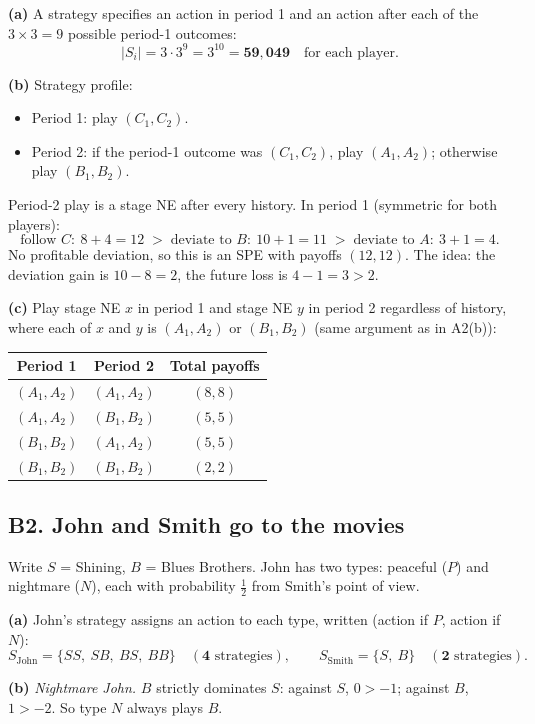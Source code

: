 \documentclass[11pt]{article}
\begin{document}
\textbf{(a)} A strategy specifies an action in period 1 and an action after each of the $3\times3=9$ possible period-1 outcomes:
\[
  |S_i| = 3\cdot 3^{9}=3^{10}=\mathbf{59{,}049}\quad\text{for each player.}
\]

\textbf{(b)} Strategy profile:
\begin{itemize}
  \item Period 1: play $(C_1,C_2)$.
  \item Period 2: if the period-1 outcome was $(C_1,C_2)$, play $(A_1,A_2)$; otherwise play $(B_1,B_2)$.
\end{itemize}
Period-2 play is a stage NE after every history. In period 1 (symmetric for both players):
\[
  \text{follow } C:\ 8+4=12 \;>\; \text{deviate to } B:\ 10+1=11 \;>\; \text{deviate to } A:\ 3+1=4 .
\]
No profitable deviation, so this is an SPE with payoffs $(12,12)$.
The idea: the deviation gain is $10-8=2$, the future loss is $4-1=3>2$.

\textbf{(c)} Play stage NE $x$ in period 1 and stage NE $y$ in period 2 regardless of history, where each of $x$ and $y$ is $(A_1,A_2)$ or $(B_1,B_2)$ (same argument as in A2(b)):
\begin{center}
\begin{tabular}{c|c|c}
  Period 1 & Period 2 & Total payoffs \\ \hline
  $(A_1,A_2)$ & $(A_1,A_2)$ & $(8,8)$ \\
  $(A_1,A_2)$ & $(B_1,B_2)$ & $(5,5)$ \\
  $(B_1,B_2)$ & $(A_1,A_2)$ & $(5,5)$ \\
  $(B_1,B_2)$ & $(B_1,B_2)$ & $(2,2)$
\end{tabular}
\end{center}

\subsection*{B2. John and Smith go to the movies}
Write $S$ = Shining, $B$ = Blues Brothers. John has two types: peaceful ($P$) and nightmare ($N$), each with probability $\tfrac12$ from Smith's point of view.

\textbf{(a)} John's strategy assigns an action to each type, written (action if $P$, action if $N$):
\[
  S_{\text{John}}=\{SS,\ SB,\ BS,\ BB\}\quad (\mathbf{4}\text{ strategies}),\qquad
  S_{\text{Smith}}=\{S,\ B\}\quad (\mathbf{2}\text{ strategies}).
\]

\textbf{(b)}
\emph{Nightmare John.} $B$ strictly dominates $S$: against $S$, $0>-1$; against $B$, $1>-2$. So type $N$ always plays $B$.
\end{document}
